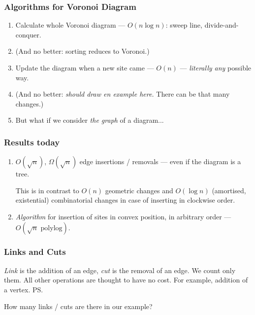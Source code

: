 \begin{frame} \frametitle{Algorithms for Voronoi Diagram}
\begin{enumerate}
	\item Calculate whole Voronoi diagram — $O(n \log n)$: sweep line, divide-and-conquer. \bigskip
	\item (And no better: sorting reduces to Voronoi.) \bigskip
	\item Update the diagram when a new site came — $O(n)$ — {\it literally any} possible way. \bigskip
	\item (And no better: {\it should draw en example here.} There can be that many changes.) \bigskip
	\item But what if we consider {\it the graph} of a diagram...
\end{enumerate}
\end{frame}

\begin{frame} \frametitle{Results today}
\begin{enumerate}
	\item $O(\sqrt{n})$, $\Omega(\sqrt{n})$ edge insertions / removals — even if the diagram is a tree. \bigskip
	
	This is in contrast to $O(n)$ geometric changes and $O(\log n)$ (amortised, existential) combinatorial changes in case of inserting in clockwise order. \bigskip

	\item {\it Algorithm} for insertion of sites in convex position, in arbitrary order — $O(\sqrt{n}\text{ polylog})$.
\end{enumerate}
\end{frame}

\begin{frame} \frametitle{Links and Cuts}
	{\it Link} is the addition of an edge, {\it cut} is the removal of an edge. We count only them. All other operations are thought to have no cost. For example, addition of a vertex. \ps

	How many links / cuts are there in our example?
\end{frame}

